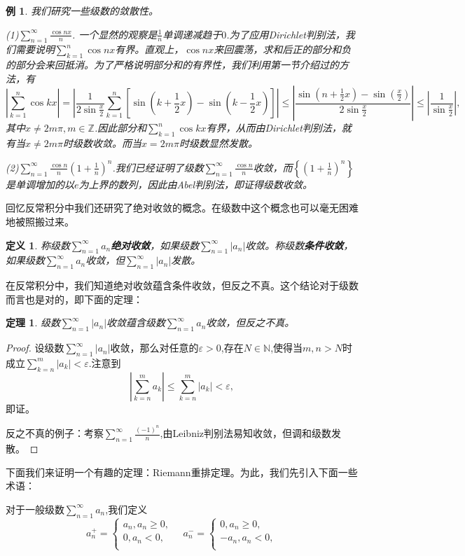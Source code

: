 \documentclass{article}
\newtheorem{definition}{定义}[subsection]
\newtheorem{theorem}{定理}[subsection]
\newtheorem{example}{例}[subsection]
\begin{document}
\begin{example}
我们研究一些级数的敛散性。\par
(1)$\sum_{n=1}^\infty\frac{\cos nx}{n}$. 一个显然的观察是$\frac{1}{n}$单调递减趋于$0$.为了应用Dirichlet判别法，我们需要说明$\sum_{k=1}^n\cos nx$有界。直观上，$\cos nx$来回震荡，求和后正的部分和负的部分会来回抵消。为了严格说明部分和的有界性，我们利用第一节介绍过的方法，有
$$
\left| \sum_{k=1}^n{\cos kx} \right|=\left| \frac{1}{2\sin \frac{x}{2}}\sum_{k=1}^n{\left[ \sin \left( k+\frac{1}{2}x \right) -\sin \left( k-\frac{1}{2}x \right) \right]} \right|\le \left| \frac{\sin \left( n+\frac{1}{2}x \right) -\sin \left( \frac{x}{2} \right)}{2\sin \frac{x}{2}} \right|\le \left| \frac{1}{\sin \frac{x}{2}} \right|,
$$
其中$x\ne 2m\pi ,m\in \mathbb{Z} $.因此部分和$\sum_{k=1}^n\cos kx$有界，从而由Dirichlet判别法，就有当$x\ne 2m\pi$时级数收敛。而当$x=2m\pi$时级数显然发散。\par
(2)$\sum_{n=1}^\infty\frac{\cos n}{n}\left(1+\frac{1}{n}\right)^n$.我们已经证明了级数$\sum_{n=1}^\infty\frac{\cos n}{n}$收敛，而$\left\{\left(1+\frac{1}{n}\right)^n\right\}$是单调增加的以$e$为上界的数列，因此由Abel判别法，即证得级数收敛。
\end{example}
回忆反常积分中我们还研究了绝对收敛的概念。在级数中这个概念也可以毫无困难地被照搬过来。
\begin{definition}
称级数$\sum_{n=1}^\infty a_n$\textbf{绝对收敛}，如果级数$\sum_{n=1}^\infty |a_n|$收敛。称级数\textbf{条件收敛}，如果级数$\sum_{n=1}^\infty a_n$收敛，但$\sum_{n=1}^\infty |a_n|$发散。
\end{definition}
在反常积分中，我们知道绝对收敛蕴含条件收敛，但反之不真。这个结论对于级数而言也是对的，即下面的定理：
\begin{theorem}
级数$\sum_{n=1}^\infty|a_n|$收敛蕴含级数$\sum_{n=1}^\infty a_n$收敛，但反之不真。
\end{theorem}
\begin{proof}
设级数$\sum_{n=1}^\infty|a_n|$收敛，那么对任意的$\varepsilon>0$,存在$N\in\mathbb{N}$,使得当$m,n>N$时成立$\sum_{k=n}^m|a_k|<\varepsilon$.注意到
$$
\left| \sum_{k=n}^m{a_k} \right|\le \sum_{k=n}^m{\left| a_k \right|}<\varepsilon ,
$$
即证。\par
反之不真的例子：考察$\sum_{n=1}^\infty\frac{(-1)^n}{n}$,由Leibniz判别法易知收敛，但调和级数发散。
\end{proof}
下面我们来证明一个有趣的定理：Riemann重排定理。为此，我们先引入下面一些术语：\par
对于一般级数$\sum_{n=1}^\infty a_n$,我们定义
$$
a_{n}^{+}=\begin{cases}
	a_n,a_n\ge 0,\\
	0,a_n<0,\\
\end{cases}\hspace{1em}a_{n}^{-}=\begin{cases}
	0,a_n\ge 0,\\
	-a_n,a_n<0,\\
\end{cases}
$$
\end{document}
